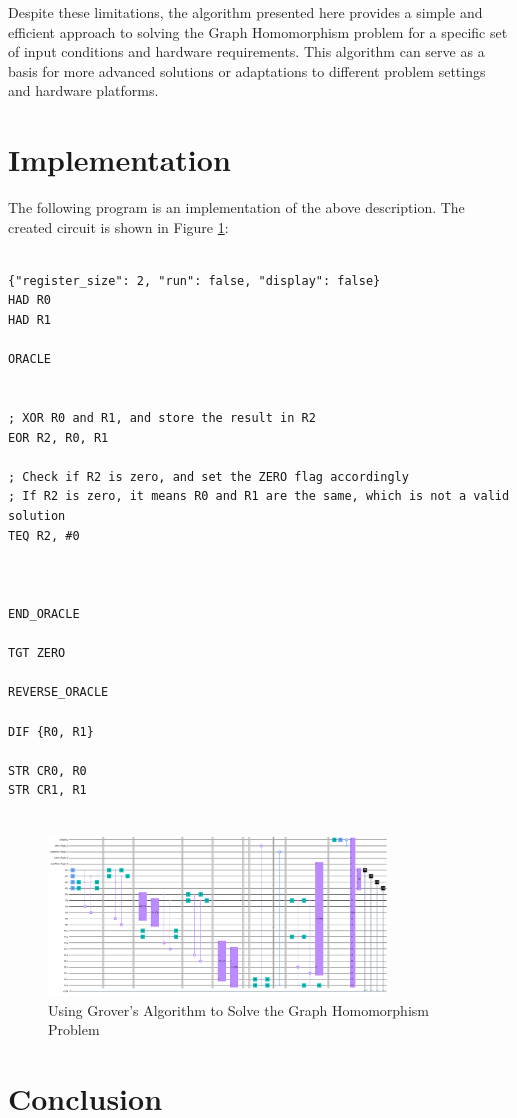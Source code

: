 Despite these limitations, the algorithm presented here provides a simple and efficient approach to solving the Graph Homomorphism problem for a specific set of input conditions and hardware requirements. This algorithm can serve as a basis for more advanced solutions or adaptations to different problem settings and hardware platforms.



\section{Implementation}

The following program is an implementation of the above description. The created circuit is shown in Figure \ref{fig:Graph_Homomorphism}:

\begin{lstlisting}

{"register_size": 2, "run": false, "display": false}
HAD R0
HAD R1

ORACLE


; XOR R0 and R1, and store the result in R2
EOR R2, R0, R1

; Check if R2 is zero, and set the ZERO flag accordingly
; If R2 is zero, it means R0 and R1 are the same, which is not a valid solution
TEQ R2, #0



END_ORACLE

TGT ZERO

REVERSE_ORACLE

DIF {R0, R1}

STR CR0, R0
STR CR1, R1


\end{lstlisting}

\begin{figure}[htp]
    \centering
    \includegraphics[width=9cm]{Figures/Graph_Homomorphism_circuit.png}
    \caption{Using Grover's Algorithm to Solve the Graph Homomorphism Problem}
    \label{fig:Graph_Homomorphism}
\end{figure}

\section{Conclusion}

